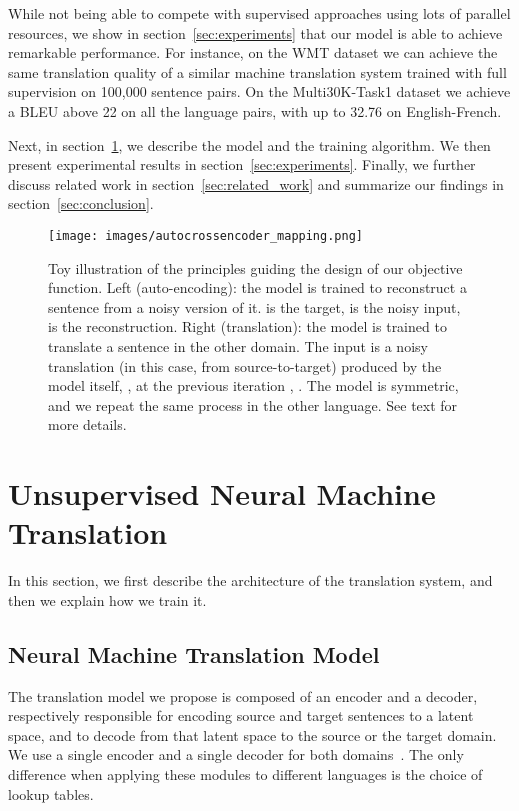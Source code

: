 \documentclass{article} \usepackage{iclr2018_conference,times}
\begin{document}
While not being able to compete with supervised approaches using lots of parallel resources, we show in section~\ref{sec:experiments} that our model is able to achieve remarkable performance. 
For instance, on the WMT dataset we can achieve the same translation quality of a similar machine translation system trained with full supervision on 100,000 sentence pairs. On the Multi30K-Task1 dataset we achieve a BLEU above 22 on all the language pairs, with up to 32.76 on English-French.

Next, in section~\ref{sec:model}, we describe the model and the training algorithm. We then present experimental results in section~\ref{sec:experiments}. Finally, we further discuss related work in section~\ref{sec:related_work} and summarize our findings in section~\ref{sec:conclusion}.

\begin{figure}[!t]
\begin{center}
\texttt{[image: images/autocrossencoder\_mapping.png]}
\end{center}
\caption{Toy illustration of the principles guiding the design of our objective function. Left (auto-encoding): the model is trained to reconstruct a sentence from a noisy version of it.  is the target,  is the noisy input,  is the reconstruction.
 Right (translation): the model is trained to translate a sentence in the other domain. The input is a noisy translation (in this case, from  source-to-target) produced by the model itself, , at the previous iteration , . The model is symmetric, and we repeat the same process in the other language.  See text for more details.}
\label{fig:model_outline2}
\end{figure}

  \section{Unsupervised Neural Machine Translation}
\label{sec:model}
In this section, we first describe the architecture of the translation system, and then we explain how we train it.

\subsection{Neural Machine Translation Model}

The translation model we propose is composed of an encoder and a decoder, respectively responsible for encoding source and target sentences to a latent space, and to decode from that latent space to the source or the target domain. We use a single encoder and a single decoder for both domains~\citep{gmt17}. The only difference when applying these modules to different languages is the choice of lookup tables.
\end{document}
